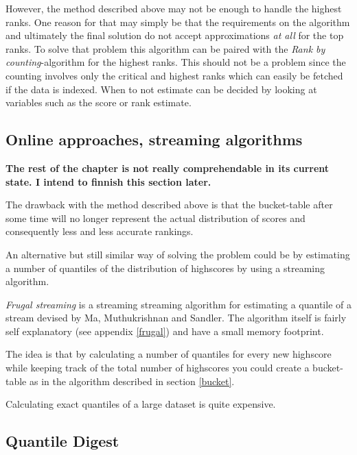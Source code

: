However, the method described above may not be enough to handle the highest ranks. One reason for that may simply be that the requirements on the algorithm and ultimately the final solution do not accept approximations \emph{at all} for the top ranks. To solve that problem this algorithm can be paired with the \emph{Rank by counting}-algorithm for the highest ranks. This should not be a problem since  the counting involves only the critical and highest ranks which can easily be fetched if the data is indexed. When to not estimate can be decided by looking at variables such as the score or rank estimate. 

\subsection{Online approaches, streaming algorithms}

\begin{mdframed}[backgroundcolor=red,innerleftmargin=15pt,leftmargin=-10pt,rightmargin=-10pt, innerrightmargin=15pt,innertopmargin=10pt,innerbottommargin=10pt, fontcolor=white, skipabove=20pt, linewidth=0]
  \textbf{The rest of the chapter is not really comprehendable in its current state. I intend to finnish this section later.}
  
\end{mdframed}

The drawback with the method described above is that the bucket-table after some time will no longer represent the actual distribution of scores and consequently less and less accurate rankings.

An alternative but still similar way of solving the problem could be by estimating a number of quantiles of the distribution of highscores by using a streaming algorithm. 

\emph{Frugal streaming} is a streaming streaming algorithm for estimating a quantile of a stream devised by Ma, Muthukrishnan and Sandler. \cite{frugal_streaming} The algorithm itself is fairly self explanatory (see appendix \ref{frugal}) and have a small memory footprint.

The idea is that by calculating a number of quantiles for every new highscore while keeping track of the total number of highscores you could create a bucket-table as in the algorithm described in section \ref{bucket}.

Calculating exact quantiles of a large dataset is quite expensive.

\subsection{Quantile Digest}

